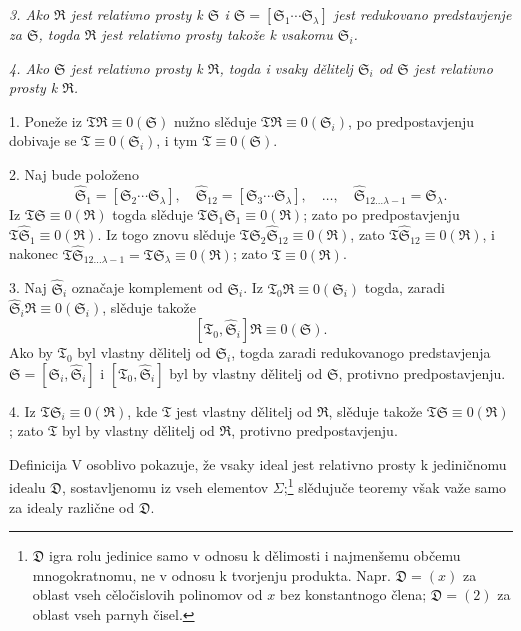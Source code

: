 \documentclass[11pt]{article}
\newcommand{\ideal}[1]{\mathfrak{#1}}
\begin{document}
\emph{3. Ako \(\ideal R\) jest relativno prosty k \(\ideal S\) i \(\ideal S=[\ideal S_1\cdots\ideal S_\lambda]\) jest redukovano predstavjenje za \(\ideal S\), togda \(\ideal R\) jest relativno prosty takože k vsakomu \(\ideal S_i\).}

\emph{4. Ako \(\ideal S\) jest relativno prosty k \(\ideal R\), togda i vsaky dělitelj \(\ideal S_i\) od \(\ideal S\) jest relativno prosty k \(\ideal R\).}

1. Poneže iz \(\ideal T\ideal R\equiv0(\ideal S)\) nužno slěduje \(\ideal T\ideal R\equiv0(\ideal S_i)\), po predpostavjenju dobivaje se \(\ideal T\equiv0(\ideal S_i)\), i tym \(\ideal T\equiv0(\ideal S)\).

2. Naj bude položeno
\[
 \widehat{\ideal S}_1=[\ideal S_2\cdots\ideal S_\lambda],\quad
 \widehat{\ideal S}_{12}=[\ideal S_3\cdots\ideal S_\lambda],\quad \ldots,\quad
 \widehat{\ideal S}_{12\ldots\lambda-1}=\ideal S_\lambda .
\]
Iz \(\ideal T\ideal S\equiv0(\ideal R)\) togda slěduje \(\ideal T\ideal S_1\widehat{\ideal S}_1\equiv0(\ideal R)\); zato po predpostavjenju \(\ideal T\widehat{\ideal S}_1\equiv0(\ideal R)\). Iz togo znovu slěduje \(\ideal T\ideal S_2\widehat{\ideal S}_{12}\equiv0(\ideal R)\), zato \(\ideal T\widehat{\ideal S}_{12}\equiv0(\ideal R)\), i nakonec \(\ideal T\widehat{\ideal S}_{12\ldots\lambda-1}=\ideal T\ideal S_\lambda\equiv0(\ideal R)\); zato \(\ideal T\equiv0(\ideal R)\).

3. Naj \(\widehat{\ideal S}_i\) označaje komplement od \(\ideal S_i\). Iz \(\ideal T_0\ideal R\equiv0(\ideal S_i)\) togda, zaradi \(\widehat{\ideal S}_i\ideal R\equiv0(\ideal S_i)\), slěduje takože
\[
 [\ideal T_0,\widehat{\ideal S}_i]\ideal R\equiv0(\ideal S).
\]
Ako by \(\ideal T_0\) byl vlastny dělitelj od \(\ideal S_i\), togda zaradi redukovanogo predstavjenja \(\ideal S=[\ideal S_i,\widehat{\ideal S}_i]\) i \([\ideal T_0,\widehat{\ideal S}_i]\) byl by vlastny dělitelj od \(\ideal S\), protivno predpostavjenju.

4. Iz \(\ideal T\ideal S_i\equiv0(\ideal R)\), kde \(\ideal T\) jest vlastny dělitelj od \(\ideal R\), slěduje takože \(\ideal T\ideal S\equiv0(\ideal R)\); zato \(\ideal T\) byl by vlastny dělitelj od \(\ideal R\), protivno predpostavjenju.

Definicija V osoblivo pokazuje, že vsaky ideal jest relativno prosty k jediničnomu idealu \(\ideal D\), sostavljenomu iz vseh elementov \(\Sigma\);\footnote{\(\ideal D\) igra rolu jedinice samo v odnosu k dělimosti i najmenšemu občemu mnogokratnomu, ne v odnosu k tvorjenju produkta. Napr. \(\ideal D=(x)\) za oblast vseh cěločislovih polinomov od \(x\) bez konstantnogo člena; \(\ideal D=(2)\) za oblast vseh parnyh čisel.} slědujuče teoremy však važe samo za idealy različne od \(\ideal D\).
\end{document}
